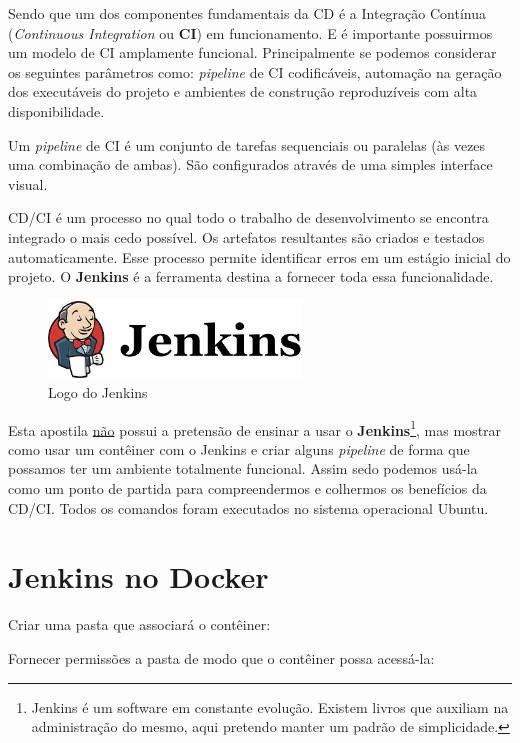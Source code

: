 \documentclass[a4paper,11pt]{article}
\begin{document}
Sendo que um dos componentes fundamentais da CD é a Integração Contínua (\textit{Continuous Integration} ou \textbf{CI}) em funcionamento. E é importante possuirmos um modelo de CI amplamente funcional. Principalmente se podemos considerar os seguintes parâmetros como: \textit{pipeline} de CI codificáveis, automação na geração dos executáveis do projeto e ambientes de construção reproduzíveis com alta disponibilidade.

Um \textit{pipeline} de CI é um conjunto de tarefas sequenciais ou paralelas (às vezes uma combinação de ambas). São configurados através de uma simples interface visual.

CD/CI é um processo no qual todo o trabalho de desenvolvimento se encontra integrado o mais cedo possível. Os artefatos resultantes são criados e testados automaticamente. Esse processo permite identificar erros em um estágio inicial do projeto. O \textbf{Jenkins}\cite{jenkins} é a ferramenta destina a fornecer toda essa funcionalidade.

\begin{figure}[!htb]
	\centering
	\includegraphics[width=0.6\textwidth]{imagens/logo.png}
	\caption{Logo do Jenkins}
\end{figure}

Esta apostila \underline{não} possui a pretensão de ensinar a usar o \textbf{Jenkins}\footnote{Jenkins é um software em constante evolução. Existem livros que auxiliam na administração do mesmo, aqui pretendo manter um padrão de simplicidade.}, mas mostrar como usar um contêiner com o Jenkins e criar alguns \textit{pipeline} de forma que possamos ter um ambiente totalmente funcional. Assim sedo podemos usá-la como um ponto de partida para compreendermos e colhermos os benefícios da CD/CI. Todos os comandos foram executados no sistema operacional Ubuntu.

\section{Jenkins no Docker}
Criar uma pasta que associará o contêiner: \\

Fornecer permissões a pasta de modo que o contêiner possa acessá-la: \\
\end{document}
